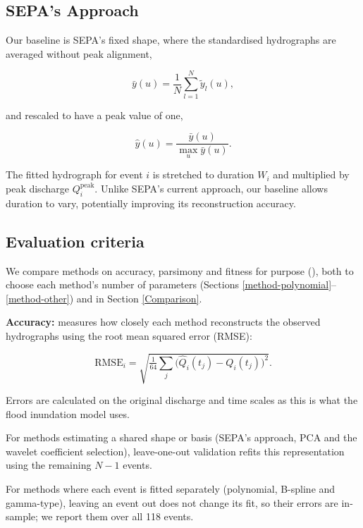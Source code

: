 \documentclass[
  11pt,
  a4paper]{article}
\begin{document}
\subsection{SEPA's Approach}\label{method-SEPA}

Our baseline is SEPA's fixed shape, where the standardised hydrographs are averaged without peak alignment,

\begin{equation}
\bar{y}(u) = \frac{1}{N}\sum_{l=1}^{N} \tilde{y}_l(u),
\label{eq:sepa}
\end{equation}

and rescaled to have a peak value of one,

\begin{equation}
\hat{y}(u) = \frac{\bar{y}(u)}{\max_u \bar{y}(u)}.
\label{eq:sepa-2}
\end{equation}

The fitted hydrograph for event \(i\) is stretched to duration \(W_i\) and multiplied by peak discharge \(Q_i^{\text{peak}}\).
Unlike SEPA's current approach, our baseline allows duration to vary, potentially improving its reconstruction accuracy.

\subsection{Evaluation criteria}\label{evaluation-criteria}

We compare methods on accuracy, parsimony and fitness for purpose (), both to choose each method's number of parameters (Sections \ref{method-polynomial}--\ref{method-other}) and in Section \ref{Comparison}.

\textbf{Accuracy:} measures how closely each method reconstructs the observed hydrographs using the root mean squared error (RMSE):

\begin{equation}
\text{RMSE}_i = \sqrt{\tfrac{1}{64}\textstyle\sum_{j}\big(\hat{Q}_i(t_j) - Q_i(t_j)\big)^2}.
\label{eq:rmse}
\end{equation}

Errors are calculated on the original discharge and time scales as this is what the flood inundation model uses.

For methods estimating a shared shape or basis (SEPA's approach, PCA and the wavelet coefficient selection), leave-one-out validation refits this representation using the remaining \(N - 1\) events.

For methods where each event is fitted separately (polynomial, B-spline and gamma-type), leaving an event out does not change its fit, so their errors are in-sample; we report them over all 118 events.
\end{document}
